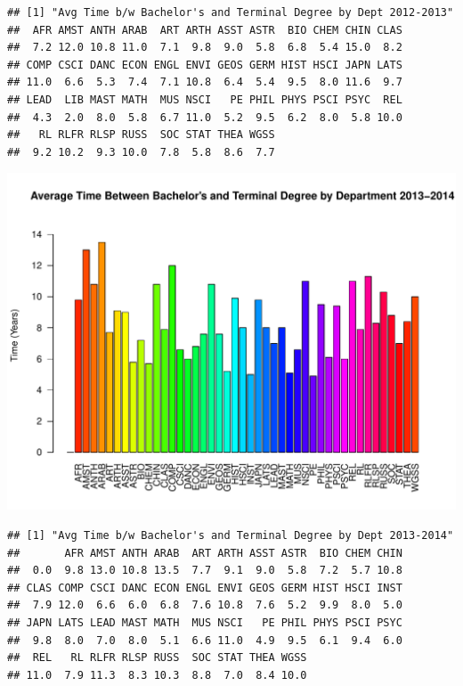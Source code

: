 \documentclass[12pt,a4paper]{article}\usepackage[]{graphicx}\usepackage[]{color}
\makeatletter
\def\maxwidth{ %
  \ifdim\Gin@nat@width>\linewidth
    \linewidth
  \else
    \Gin@nat@width
  \fi
}
\newenvironment{kframe}{%
 \def\at@end@of@kframe{}%
 \ifinner\ifhmode%
  \def\at@end@of@kframe{\end{minipage}}%
  \begin{minipage}{\columnwidth}%
 \fi\fi%
 \def\FrameCommand##1{\hskip\@totalleftmargin \hskip-\fboxsep
 \colorbox{shadecolor}{##1}\hskip-\fboxsep
     \hskip-\linewidth \hskip-\@totalleftmargin \hskip\columnwidth}%
 \MakeFramed {\advance\hsize-\width
   \@totalleftmargin\z@ \linewidth\hsize
   \@setminipage}}%
 {\par\unskip\endMakeFramed%
 \at@end@of@kframe}
\newenvironment{knitrout}{}{} %
\theoremstyle{definition}
\makeatother
\begin{document}
\begin{knitrout}
\begin{kframe}\begin{verbatim}
## [1] "Avg Time b/w Bachelor's and Terminal Degree by Dept 2012-2013"
##  AFR AMST ANTH ARAB  ART ARTH ASST ASTR  BIO CHEM CHIN CLAS 
##  7.2 12.0 10.8 11.0  7.1  9.8  9.0  5.8  6.8  5.4 15.0  8.2 
## COMP CSCI DANC ECON ENGL ENVI GEOS GERM HIST HSCI JAPN LATS 
## 11.0  6.6  5.3  7.4  7.1 10.8  6.4  5.4  9.5  8.0 11.6  9.7 
## LEAD  LIB MAST MATH  MUS NSCI   PE PHIL PHYS PSCI PSYC  REL 
##  4.3  2.0  8.0  5.8  6.7 11.0  5.2  9.5  6.2  8.0  5.8 10.0 
##   RL RLFR RLSP RUSS  SOC STAT THEA WGSS 
##  9.2 10.2  9.3 10.0  7.8  5.8  8.6  7.7
\end{verbatim}
\end{kframe}
\includegraphics[width=\maxwidth]{figure/unnamed-chunk-12-10} 
\begin{kframe}\begin{verbatim}
## [1] "Avg Time b/w Bachelor's and Terminal Degree by Dept 2013-2014"
##       AFR AMST ANTH ARAB  ART ARTH ASST ASTR  BIO CHEM CHIN 
##  0.0  9.8 13.0 10.8 13.5  7.7  9.1  9.0  5.8  7.2  5.7 10.8 
## CLAS COMP CSCI DANC ECON ENGL ENVI GEOS GERM HIST HSCI INST 
##  7.9 12.0  6.6  6.0  6.8  7.6 10.8  7.6  5.2  9.9  8.0  5.0 
## JAPN LATS LEAD MAST MATH  MUS NSCI   PE PHIL PHYS PSCI PSYC 
##  9.8  8.0  7.0  8.0  5.1  6.6 11.0  4.9  9.5  6.1  9.4  6.0 
##  REL   RL RLFR RLSP RUSS  SOC STAT THEA WGSS 
## 11.0  7.9 11.3  8.3 10.3  8.8  7.0  8.4 10.0
\end{verbatim}
\end{kframe}
\end{knitrout}
\end{document}
